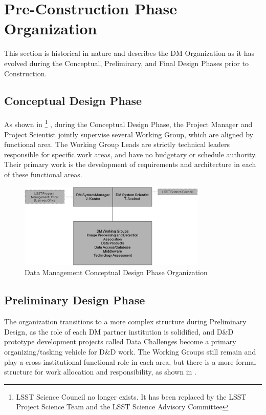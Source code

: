 \section{Pre-Construction Phase Organization}
This section is historical in nature and describes the DM Organization as it has evolved during the Conceptual, Preliminary, and Final Design Phases prior to Construction.
\subsection{Conceptual Design Phase}
As shown in 
\footnote{LSST Science Council no longer exists. It has been replaced by the LSST Project Science Team and the LSST Science Advisory Committee }
, during the Conceptual Design Phase, the Project Manager and Project Scientist jointly supervise several Working Group, which are aligned by functional area.  The Working Group Leads are strictly technical leaders responsible for specific work areas, and have no budgetary or schedule authority.  Their primary work is the development of requirements and architecture in each of these functional areas.



\begin{figure}[htbp]
\begin{center}
 \includegraphics[width=0.8\textwidth]{images/precon}
\caption{Data Management Conceptual Design Phase Organization\label{fig:precon}}
\end{center}
\end{figure}

\subsection{
Preliminary Design Phase
}
The organization transitions to a more complex structure during Preliminary Design, as the role of each DM partner institution is solidified, and D\&D prototype development projects called Data Challenges become a primary organizing/tasking vehicle for D\&D work.  The Working Groups still remain and play a cross-institutional functional role in each area, but there is a more formal structure for work allocation and responsibility, as shown in .



